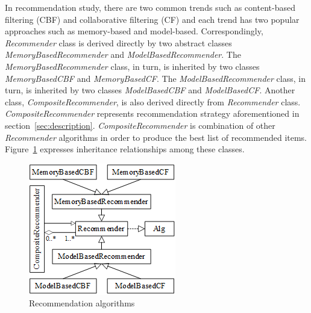 \documentclass[a4paper,twoside]{article}
\begin{document}
In recommendation study, there are two common trends such as content-based filtering (CBF) and collaborative filtering (CF) and each trend has two popular approaches such as memory-based and model-based. Correspondingly, \textit{Recommender} class is derived directly by two abstract classes \textit{MemoryBasedRecommender} and \textit{ModelBasedRecommender}. The \textit{MemoryBasedRecommender} class, in turn, is inherited by two classes \textit{MemoryBasedCBF} and \textit{MemoryBasedCF}. The \textit{ModelBasedRecommender} class, in turn, is inherited by two classes \textit{ModelBasedCBF} and \textit{ModelBasedCF}. Another class, \textit{CompositeRecommender}, is also derived directly from \textit{Recommender} class. \textit{CompositeRecommender} represents recommendation strategy aforementioned in section~\ref{sec:description}. \textit{CompositeRecommender} is combination of other \textit{Recommender} algorithms in order to produce the best list of recommended items. Figure~\ref{figure:recommendation-algorithms} expresses inheritance relationships among these classes.
\begin{figure}
\centering
\includegraphics{RecommenderAlgorithms.png}
\caption{Recommendation algorithms}
\label{figure:recommendation-algorithms}
\end{figure}
\end{document}
